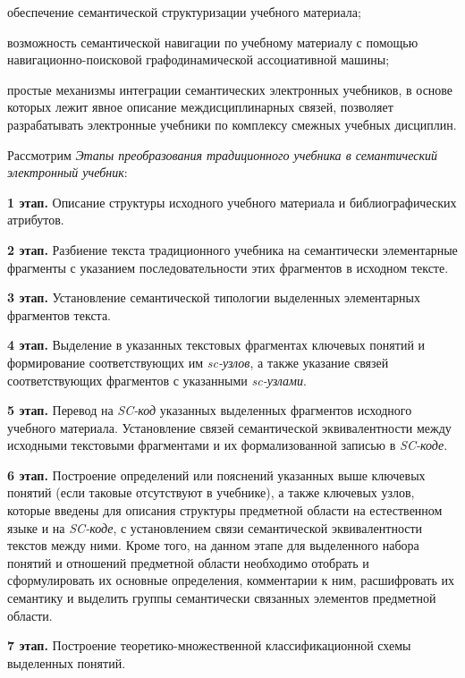 \begin{textitemize}
	\item
	обеспечение семантической структуризации учебного материала;
	\item
	возможность семантической навигации по учебному материалу с помощью навигационно-поисковой графодинамической ассоциативной машины;
	\item
	простые механизмы интеграции семантических электронных учебников, в основе которых лежит явное описание междисциплинарных связей, позволяет разрабатывать электронные учебники по комплексу смежных учебных дисциплин.
\end{textitemize}

Рассмотрим \textit{Этапы преобразования традиционного учебника в семантический электронный учебник}:

\textbf{1 этап.} Описание структуры исходного учебного материала и библиографических атрибутов.

\textbf{2 этап.} Разбиение текста традиционного учебника на семантически элементарные фрагменты с указанием последовательности этих фрагментов в исходном тексте.

\textbf{3 этап.} Установление семантической типологии выделенных элементарных фрагментов текста.

\textbf{4 этап.} Выделение в указанных текстовых фрагментах ключевых понятий и формирование соответствующих им \textit{sc-узлов}, а также указание связей соответствующих фрагментов с указанными \textit{sc-узлами}.

\textbf{5 этап.} Перевод на \textit{SC-код} указанных выделенных фрагментов исходного учебного материала. Установление связей семантической эквивалентности между исходными текстовыми фрагментами и их формализованной записью в \textit{SC-коде}.

\textbf{6 этап.} Построение определений или пояснений указанных выше ключевых понятий (если таковые отсутствуют в учебнике), а также ключевых узлов, которые введены для описания структуры предметной области на естественном языке и на \textit{SC-коде}, с установлением связи семантической эквивалентности текстов между ними. Кроме того, на данном этапе для выделенного набора понятий и отношений предметной области необходимо отобрать и сформулировать их основные определения, комментарии к ним, расшифровать их семантику и выделить группы семантически связанных элементов предметной области.

\textbf{7 этап.} Построение теоретико-множественной классификационной схемы выделенных понятий.

